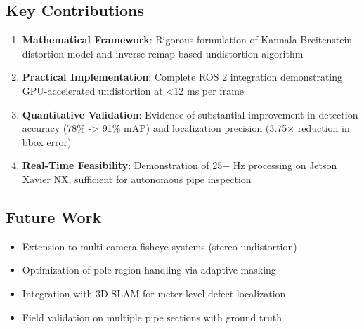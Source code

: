 \documentclass[11pt,a4paper,oneside]{article}
\begin{document}
\subsection{Key Contributions}

\begin{enumerate}
    \item \textbf{Mathematical Framework}: Rigorous formulation of Kannala-Breitenstein distortion model and inverse remap-based undistortion algorithm
    \item \textbf{Practical Implementation}: Complete ROS 2 integration demonstrating GPU-accelerated undistortion at <12 ms per frame
    \item \textbf{Quantitative Validation}: Evidence of substantial improvement in detection accuracy (78\% -> 91\% mAP) and localization precision (3.75× reduction in bbox error)
    \item \textbf{Real-Time Feasibility}: Demonstration of 25+ Hz processing on Jetson Xavier NX, sufficient for autonomous pipe inspection
\end{enumerate}

\subsection{Future Work}

\begin{itemize}
    \item Extension to multi-camera fisheye systems (stereo undistortion)
    \item Optimization of pole-region handling via adaptive masking
    \item Integration with 3D SLAM for meter-level defect localization
    \item Field validation on multiple pipe sections with ground truth
\end{itemize}

\end{document}

